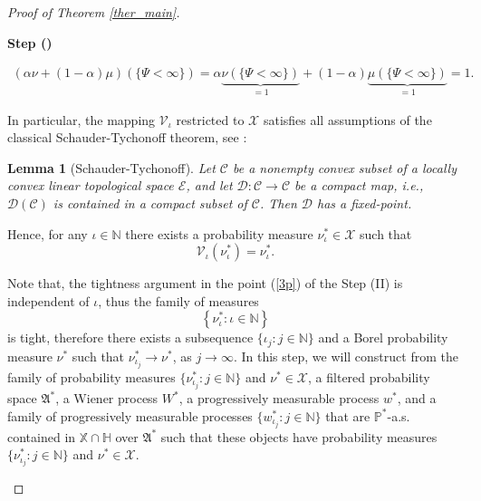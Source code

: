 \documentclass[english,a4paper,11pt]{amsart}
\theoremstyle{plain}
\newtheorem{lemma}[theorem]{Lemma}
\theoremstyle{definition}
\theoremstyle{remark}
\numberwithin{equation}{section}
\newcounter{lil1}
\newenvironment{step}
{\begin{list} { \bf Step (\Roman{lil1})}
		{ \usecounter{lil1}
			\setlength{\leftmargin}{0.0cm}
			\setlength{\topsep}{0.2cm}
			\setlength{\itemsep}{0.0cm}
			\setlength{\parsep}{0.1cm}
			\setlength{\itemindent}{0.8cm}
			\setlength{\parskip}{0.0cm}}}
	{\end{list}}
\newcounter{lil33}
\newcounter{lil1q}
\newcommand{\NN}{\mathbb{N}}
\newcommand{\PP}{{\mathbb{P}}}
\begin{document}
\begin{proof}[Proof of Theorem \ref{ther_main}]
\begin{step}
\begin{enumerate}[(1)]
\begin{align*}
	\left(\alpha \nu+(1-\alpha)\mu\right)\left(\{\Psi<\infty\}\right)
=\alpha \underbrace{\nu\left(\{\Psi<\infty\}\right)}_{=1}
	+(1-\alpha)\underbrace{\mu\left(\{\Psi<\infty\}\right)}_{=1}=1.
\end{align*}
\end{enumerate}
In particular, the mapping $\mathscr{V}_\iota$ restricted to $\mathscr{X}$
satisfies all assumptions of the classical Schauder-Tychonoff theorem, see \cite[§ 7, Theorem 1.13, p.~148]{granas}:
\begin{lemma}[Schauder-Tychonoff]
Let $\mathcal{C}$ be a nonempty convex subset of a locally convex linear topological space $\mathcal{E}$, and let $\mathcal{D}:\mathcal{C}\to\mathcal{C}$ be a compact map, i.e., $\mathcal{D}(\mathcal{C})$ is contained in a compact subset of $\mathcal{C}$. Then $\mathcal{D}$ has a fixed-point.
\end{lemma}

Hence, for any $\iota\in\NN$ there exists a probability measure $\nu^\ast_\iota\in\mathscr{X}$ such that $$\mathscr{V_\iota}(\nu^\ast_\iota)=\nu^\ast_\iota.$$



\item
Note that, the tightness argument in the point (\ref{3p}) of the Step (II) is independent of $\iota$, thus the family of measures
$$
\left\{ \nu^\ast_\iota:\iota\in\NN\right\}
$$				
is tight, therefore there exists a subsequence $\{\iota_j:j\in\NN\}$ and a Borel probability measure $\nu^\ast$ such that
$ \nu_{\iota_j}^\ast\to 	 \nu^\ast$, as $j\to\infty$.	
In this step, we will construct from the family of probability measures $\{\nu^\ast_{\iota_j}:j\in\NN\}$ and $\nu^\ast\in\mathscr{X}$, a filtered probability space $\mathfrak{A}^\ast$, a Wiener process
${W}^\ast$, a
progressively measurable process $w^\ast$, and
a family of progressively measurable processes  $\{ w_{\iota_j}^\ast:j\in\NN\}$ that
are $\PP^\ast$-a.s. contained in $\mathbb{X}\cap\mathbb{H}$
over $\mathfrak{A}^\ast$ such that these objects have probability measures $\{\nu^\ast_{\iota_j}:j\in\NN\}$ and $\nu^\ast\in\mathscr{X}$.


\end{step}
\end{proof}
\end{document}
